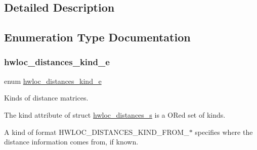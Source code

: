 \subsection{Detailed Description}


\subsection{Enumeration Type Documentation}
\mbox{\label{a00208_gab1bb10d3adb85b52cdc6fe5a7f74f108}} 
\subsubsection{\texorpdfstring{hwloc\+\_\+distances\+\_\+kind\+\_\+e}{hwloc\_distances\_kind\_e}}
{\footnotesize\ttfamily enum \hyperlink{a00208_gab1bb10d3adb85b52cdc6fe5a7f74f108}{hwloc\+\_\+distances\+\_\+kind\+\_\+e}}



Kinds of distance matrices. 

The {\ttfamily kind} attribute of struct \hyperlink{a00310}{hwloc\+\_\+distances\+\_\+s} is a OR\textquotesingle{}ed set of kinds.

A kind of format H\+W\+L\+O\+C\+\_\+\+D\+I\+S\+T\+A\+N\+C\+E\+S\+\_\+\+K\+I\+N\+D\+\_\+\+F\+R\+O\+M\+\_\+$\ast$ specifies where the distance information comes from, if known.

